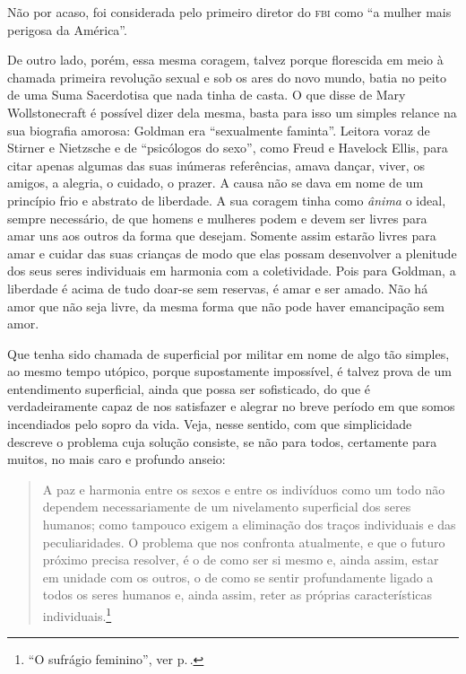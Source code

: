   Não por acaso, foi considerada pelo primeiro diretor do
\textsc{fbi} como ``a mulher mais perigosa da América''.

De outro lado, porém, essa mesma coragem, talvez porque florescida em
meio à chamada primeira revolução sexual e sob os ares do novo mundo,
batia no peito de uma Suma Sacerdotisa que nada tinha de casta. O que
disse de Mary Wollstonecraft é possível dizer dela mesma, basta para
isso um simples relance na sua biografia amorosa: Goldman era
``sexualmente faminta''. Leitora voraz de Stirner e Nietzsche e de
``psicólogos do sexo'', como Freud e Havelock Ellis, para citar apenas
algumas das suas inúmeras referências, amava dançar, viver, os amigos, a
alegria, o cuidado, o prazer. A causa não se dava em nome de um
princípio frio e abstrato de liberdade. A sua coragem tinha como
\textit{ânima} o ideal, sempre necessário, de que homens e mulheres podem e
devem ser livres para amar uns aos outros da forma que desejam.
Somente assim estarão livres para amar e cuidar das suas
crianças de modo que elas possam desenvolver a plenitude dos seus seres
individuais em harmonia com a coletividade. Pois para Goldman, a
liberdade é acima de tudo doar-se sem reservas, é amar e ser amado. Não
há amor que não seja livre, da mesma forma que não pode haver
emancipação sem amor.

Que tenha sido chamada de superficial por militar
em nome de algo tão simples, ao mesmo tempo
utópico, porque supostamente impossível, é talvez prova de um
entendimento superficial, ainda que possa ser sofisticado, do que é
verdadeiramente capaz de nos satisfazer e alegrar no breve período em
que somos incendiados pelo sopro da vida. Veja, nesse sentido, com que
simplicidade descreve o problema cuja
solução consiste, se não para todos, certamente para muitos, no mais
caro e profundo anseio:

\begin{quote}
A paz e harmonia entre os sexos e entre os indivíduos como um todo não
dependem necessariamente de um nivelamento superficial dos seres
humanos; como tampouco exigem a eliminação dos traços individuais e das
peculiaridades. O problema que nos confronta atualmente, e que o futuro
próximo precisa resolver, é o de como ser si mesmo e, ainda assim, estar
em unidade com os outros, o de como se sentir profundamente ligado a
todos os seres humanos e, ainda assim, reter as próprias características
individuais.\footnote{``O sufrágio feminino'', ver p.\,\pageref{ref6}.}
\end{quote}

